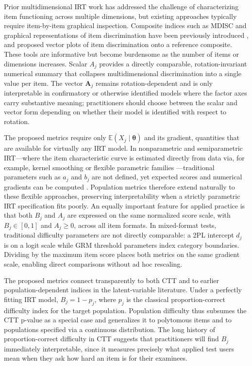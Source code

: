 \documentclass[man, 12pt, floatsintext]{apa7}
\begin{document}
Prior multidimensional IRT work has addressed the challenge of characterizing item functioning across multiple dimensions, but existing approaches typically require item-by-item graphical inspection. Composite indices such as MDISC and graphical representations of item discrimination have been previously introduced \parencite{Reckase2009}, and \textcite{Ackerman1996Graphical} proposed vector plots of item discrimination onto a reference composite. These tools are informative but become burdensome as the number of items or dimensions increases. Scalar $A_j$ provides a directly comparable, rotation-invariant numerical summary that collapses multidimensional discrimination into a single value per item. The vector $\mathbf{A}_j$ remains rotation-dependent and is only interpretable in confirmatory or otherwise identified models where the factor axes carry substantive meaning; practitioners should choose between the scalar and vector form depending on whether their model is identified with respect to rotation.

The proposed metrics require only $\mathbb{E}(X_j \mid \boldsymbol{\theta})$ and its gradient, quantities that are available for virtually any IRT model. In nonparametric and semiparametric IRT---where the item characteristic curve is estimated directly from data via, for example, kernel smoothing \parencite{Ramsay1991} or flexible parametric families \parencite{Feuerstahler2021}---traditional parameters such as $a_j$ and $b_j$ are not defined, yet expected scores and numerical gradients can be computed \parencite{SijtsmaMolenaar2002, BaghaeiEffatpanah2024}. Population metrics therefore extend naturally to these flexible approaches, preserving interpretability when a strictly parametric IRT specification fits poorly. An equally important feature for applied practice is that both $B_j$ and $A_j$ are expressed on the same normalized score scale, with $B_j \in [0, 1]$ and $A_j \geq 0$, across all item formats. In mixed-format tests, traditional difficulty parameters are not directly comparable: a 2PL intercept $d_j$ is on a logit scale while GRM threshold parameters index category boundaries. Dividing by the maximum item score places both metrics on the same gradient scale, enabling direct comparisons without ad hoc rescaling.

The proposed metrics connect transparently to both CTT and to earlier population-dependent indices in the latent-variable literature. Under a perfectly fitting IRT model, $B_j = 1 - p_j$, where $p_j$ is the classical proportion-correct difficulty index for the target population. Population difficulty thus subsumes the CTT p-value as a special case and generalizes it to polytomous items and to populations specified via a continuous distribution. The long history of proportion-correct difficulty in CTT \parencite{Kelley1939} suggests that practitioners will find $B_j$ immediately interpretable, since it measures precisely what applied test users mean when they ask how hard an item is for their examinees.
\end{document}
